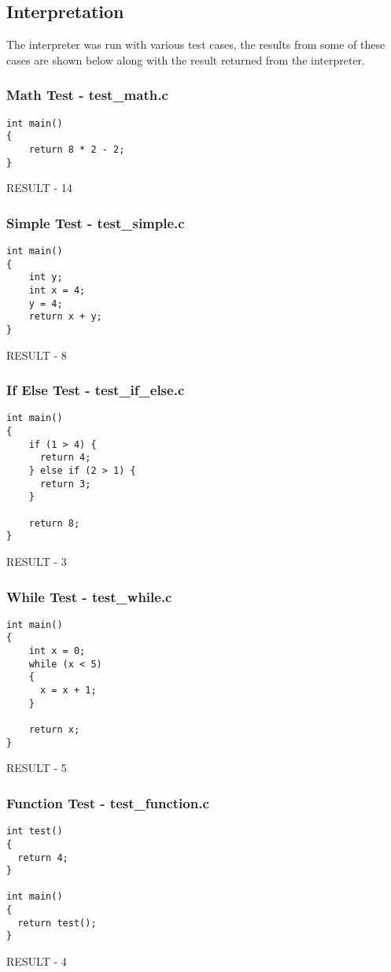 \documentclass{article}
\begin{document}
\subsection{Interpretation}
The interpreter was run with various test cases, the results from some of these
cases are shown below along with the result returned from the interpreter.

\subsubsection{Math Test - test\_math.c}
\begin{lstlisting}
int main()
{
    return 8 * 2 - 2;
}
\end{lstlisting}
RESULT - 14

\subsubsection{Simple Test - test\_simple.c}
\begin{lstlisting}
int main()
{
    int y;
    int x = 4;
    y = 4;
    return x + y;
}
\end{lstlisting}
RESULT - 8

\subsubsection{If Else Test - test\_if\_else.c}
\begin{lstlisting}
int main()
{
    if (1 > 4) {
      return 4;
    } else if (2 > 1) {
      return 3;
    }

    return 8;
}
\end{lstlisting}
RESULT - 3

\subsubsection{While Test - test\_while.c}
\begin{lstlisting}
int main()
{
    int x = 0;
    while (x < 5)
    {
      x = x + 1;
    }

    return x;
}
\end{lstlisting}
RESULT - 5

\subsubsection{Function Test - test\_function.c}
\begin{lstlisting}
int test()
{
  return 4;
}

int main()
{
  return test();
}
\end{lstlisting}
RESULT - 4
\end{document}

